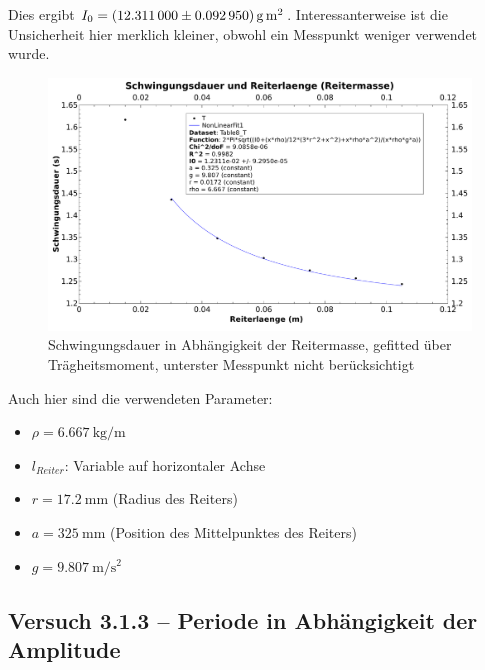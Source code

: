 Dies ergibt
$I_0  = \SI[separate-uncertainty = true]{12.311 \pm 0.092950}{\gram\meter\squared}$.
Interessanterweise  ist die  Unsicherheit  hier merklich  kleiner, obwohl  ein
Messpunkt weniger verwendet wurde.

\begin{figure}[h!]
    \centering
    \includegraphics[width=\textwidth]{images/312c.pdf}
    \caption{%
        Schwingungsdauer in Abh\"angigkeit der Reitermasse, gefitted \"uber Tr\"agheitsmoment, unterster Messpunkt nicht ber\"ucksichtigt
    }
    \label{fig:312c}
\end{figure}

Auch hier sind die verwendeten Parameter:
\begin{itemize}
    \item
        $\rho = \SI{6.667}{\kilo\gram\per\meter}$
    \item
        $l_{Reiter}$: Variable auf horizontaler Achse
    \item
        $r = \SI{17.2}{\milli\meter}$ (Radius des Reiters)
    \item
        $a = \SI{325}{\milli\meter}$ (Position des Mittelpunktes des Reiters)
    \item
        $g = \SI{9.807}{\meter\per\second\squared}$
\end{itemize}

\clearpage
\subsection{Versuch 3.1.3 -- Periode in Abh\"angigkeit der Amplitude}
\label{subsec:periodeAmplitude}

